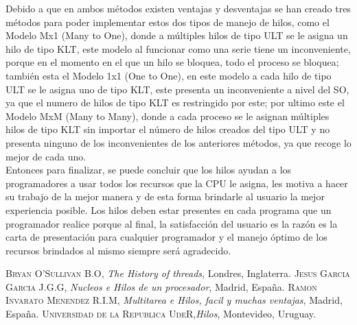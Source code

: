 \documentclass{article}
\begin{document}
Debido a que en ambos métodos existen ventajas y desventajas se han creado tres métodos para poder implementar estos dos tipos de manejo de hilos, como el Modelo Mx1 (Many to One), donde a múltiples hilos de tipo ULT se le asigna un hilo de tipo KLT, este modelo al funcionar como una serie tiene un inconveniente, porque en el momento en el que un hilo se bloquea, todo el proceso se bloquea; también esta el Modelo 1x1 (One to One), en este modelo a cada hilo de tipo ULT se le asigna uno de tipo KLT, este presenta un inconveniente a nivel del SO, ya que el numero de hilos de tipo KLT es restringido por este; por ultimo este el Modelo MxM (Many to Many), donde a cada proceso se le asignan múltiples hilos de tipo KLT sin importar el número de hilos creados del tipo ULT y no presenta ninguno de los inconvenientes de los anteriores métodos, ya que recoge lo mejor de cada uno.\\

Entonces para finalizar, se puede concluir que los hilos ayudan a los programadores a usar todos los recursos que la CPU le asigna, les motiva a hacer su trabajo de la mejor manera y de esta forma brindarle al usuario la mejor experiencia posible. Los hilos deben estar presentes en cada programa que un programador realice porque al final, la satisfacción del usuario es la razón es la carta de presentación para cualquier programador y el manejo óptimo de los recursos brindados al mismo siempre será agradecido.\\








\newpage


\begin{thebibliography}{X}
 \textsc{Bryan O'Sullivan B.O},
\textit{The History of threads}, Londres, Inglaterra.
 \textsc{Jesus Garcia Garcia J.G.G},
\textit{ Nucleos e Hilos de un procesador}, Madrid, España.
 \textsc{Ramon Invarato Menendez R.I.M},\textit{ Multitarea e Hilos, facil y muchas ventajas}, Madrid, España.
 \textsc{Universidad de la Republica UdeR},\textit{Hilos}, Montevideo, Uruguay.

\end{thebibliography}
\end{document}
